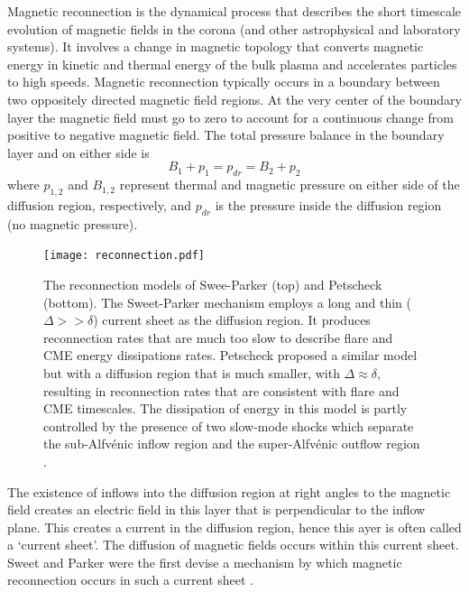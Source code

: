 Magnetic reconnection is the dynamical process that describes the short timescale evolution of magnetic fields in the corona (and other astrophysical and laboratory systems). It involves a change in magnetic topology that converts magnetic energy in kinetic and thermal energy of the bulk plasma and accelerates particles to high speeds. Magnetic reconnection typically occurs in a boundary between two oppositely directed magnetic field regions. At the very center of the boundary layer the magnetic field must go to zero to account for a continuous change from positive to negative magnetic field. The total pressure balance in the boundary layer and on either side is \citep{asch2004}
\begin{equation}
B_1 + p_1 = p_{dr} = B_2 + p_2
\end{equation}
where $p_{1,2}$ and $B_{1,2}$ represent thermal and magnetic pressure on either side of the diffusion region, respectively, and $p_{dr}$ is the pressure inside the diffusion region (no magnetic pressure).


\begin{figure}[!t]
\begin{center}
\texttt{[image: reconnection.pdf]}
\caption[Sweet-Parker and Petscheck reconnection models]{The reconnection models of Swee-Parker (top) and Petscheck (bottom). The Sweet-Parker mechanism employs a long and thin ($\Delta>>\delta$) current sheet as the diffusion region. It produces reconnection rates that are much too slow to describe flare and CME energy dissipations rates. Petscheck proposed a similar model but with a diffusion region that is much smaller, with $\Delta\approx\delta$, resulting in reconnection rates that are consistent with flare and CME timescales. The dissipation of energy in this model is partly controlled by the presence of two slow-mode shocks which separate the sub-Alfv\'{e}nic inflow region and the super-Alfv\'{e}nic outflow region \citep{asch2004}.}
\label{fig:recconection}
\end{center}
\end{figure}
The existence of inflows into the diffusion region at right angles to the magnetic field creates an electric field in this layer that is perpendicular to the inflow plane. This creates a current in the diffusion region, hence this ayer is often called a `current sheet'. The diffusion of magnetic fields occurs within this current sheet. Sweet and Parker were the first devise a mechanism by which magnetic reconnection occurs in such a current sheet \cite{sweet1958, parker1963}. 

